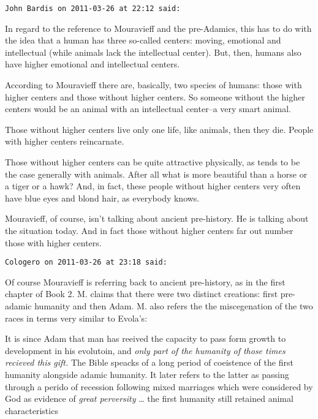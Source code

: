 \begin{footnotesize}\begin{sffamily}



\texttt{John Bardis on 2011-03-26 at 22:12 said: }

In regard to the reference to Mouravieff and the pre-Adamics, this has to do with the idea that a human has three so-called centers: moving, emotional and intellectual (while animals lack the intellectual center). But, then, humans also have higher emotional and intellectual centers.

According to Mouravieff there are, basically, two species of humans: those with higher centers and those without higher centers. So someone without the higher centers would be an animal with an intellectual center–a very smart animal.

Those without higher centers live only one life, like animals, then they die. People with higher centers reincarnate.

Those without higher centers can be quite attractive physically, as tends to be the case generally with animals. After all what is more beautiful than a horse or a tiger or a hawk? And, in fact, these people without higher centers very often have blue eyes and blond hair, as everybody knows.

Mouravieff, of course, isn't talking about ancient pre-history. He is talking about the situation today. And in fact those without higher centers far out number those with higher centers.


\hfill

\texttt{Cologero on 2011-03-26 at 23:18 said: }

Of course Mouravieff is referring back to ancient pre-history, as in the first chapter of Book 2. M. claims that there were two distinct creations: first pre-adamic humanity and then Adam. M. also refers the the miscegenation of the two races in terms very similar to Evola's:

\begin{quotex}
It is since Adam that man has reeived the capacity to pass form growth to development in his evolutoin, and \emph{only part of the humanity of those times recieved this gift.} The Bible speacks of a long period of coeistence of the first humanity alongside adamic humanity. It later refers to the latter as passing through a perido of recession following mixed marriages which were considered by God as evidence of \emph{great perversity} … the first humanity still retained animal characteristics 


\end{quotex}
\end{sffamily}
\end{footnotesize}
